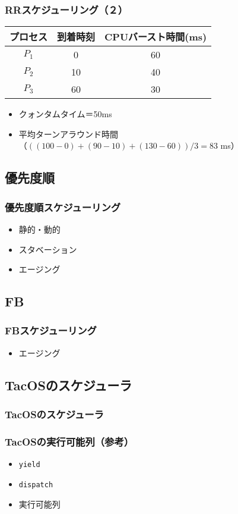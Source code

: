\documentclass{beamer}                   %
\begin{document}
\begin{frame}
  \frametitle{RRスケジューリング（２）}
  \small\begin{tabular}{c c c}
    プロセス & 到着時刻 & CPUバースト時間(ms) \\
    \hline
    $P_1$    & 0  & 60 \\
    $P_2$    & 10 & 40 \\
    $P_3$    & 60 & 30 \\
  \end{tabular}
  \begin{itemize}
    \item クォンタムタイム＝50ms
    \item 平均ターンアラウンド時間\\
      （$((100-0)+(90-10)+(130-60))/3=83$ ms）
  \end{itemize}
\end{frame}

\subsection{優先度順}
\begin{frame}
  \frametitle{優先度順スケジューリング}
  \begin{itemize}
    \item 静的・動的
    \item スタベーション
    \item エージング
  \end{itemize}
\end{frame}


\subsection{FB}
\begin{frame}
  \frametitle{FBスケジューリング}
  \begin{itemize}
    \item エージング
  \end{itemize}
\end{frame}

\subsection{TacOSのスケジューラ}
\begin{frame}[fragile]
  \frametitle{TacOSのスケジューラ}
\end{frame}

\begin{frame}
  \frametitle{TacOSの実行可能列（参考）}
  \begin{itemize}
    \item {\tt yield}
    \item {\tt dispatch}
    \item 実行可能列
  \end{itemize}
\end{frame}
\end{document}
